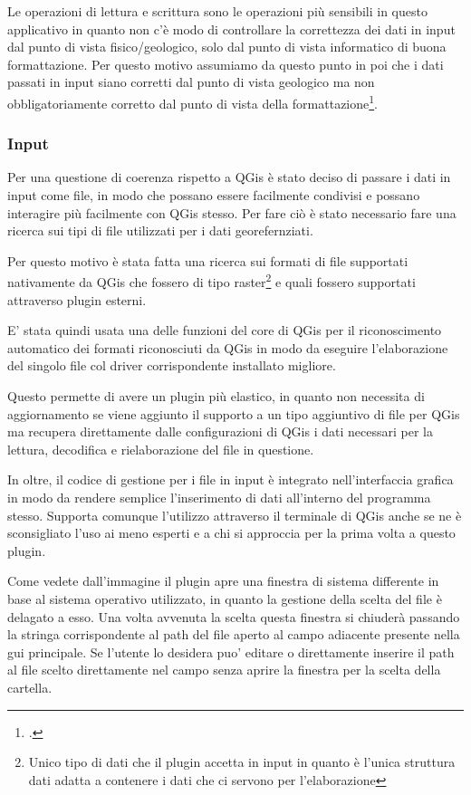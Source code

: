 Le operazioni di lettura e scrittura sono le operazioni più sensibili in questo applicativo in quanto non c'è modo di controllare la correttezza dei dati in input dal punto di vista fisico/geologico, solo dal punto di vista informatico di buona formattazione.
Per questo motivo assumiamo da questo punto in poi che i dati passati in input siano corretti dal punto di vista geologico ma non obbligatoriamente corretto dal punto di vista della formattazione\footcite{Il controllo del formato del file viene fatto in modo automatico quando il plugin cerca di caricare i file passati per indirizzo}. 

\subsubsection{Input}
Per una questione di coerenza rispetto a QGis è stato deciso di passare i dati in input come file, in modo che possano essere facilmente condivisi e possano interagire più facilmente con QGis stesso. Per fare ciò è stato necessario fare una ricerca sui tipi di file utilizzati per i dati georefernziati.

Per questo motivo è stata fatta una ricerca sui formati di file supportati nativamente da QGis che fossero di tipo raster\footnote{Unico tipo di dati che il plugin accetta in input in quanto è l'unica struttura dati adatta a contenere i dati che ci servono per l'elaborazione} e quali fossero supportati attraverso plugin esterni.

E' stata quindi usata una delle funzioni del core di QGis per il riconoscimento automatico dei formati riconosciuti da QGis in modo da eseguire l'elaborazione del singolo file col driver corrispondente installato migliore.

Questo permette di avere un plugin più elastico, in quanto non necessita di aggiornamento se viene aggiunto il supporto a un tipo aggiuntivo di file per QGis ma recupera direttamente dalle configurazioni di QGis i dati necessari per la lettura, decodifica e rielaborazione del file in questione.

In oltre, il codice di gestione per i file in input è integrato nell'interfaccia grafica in modo da rendere semplice l'inserimento di dati all'interno del programma stesso. Supporta comunque l'utilizzo attraverso il terminale di QGis anche se ne è sconsigliato l'uso ai meno esperti e a chi si approccia per la prima volta a questo plugin.

Come vedete dall'immagine il plugin apre una finestra di sistema differente in base al sistema operativo utilizzato, in quanto la gestione della scelta del file è delagato a esso. Una volta avvenuta la scelta questa finestra si chiuderà passando la stringa corrispondente al path del file aperto al campo adiacente presente nella gui principale. %
Se l'utente lo desidera puo' editare o direttamente inserire il path al file scelto direttamente nel campo senza aprire la finestra per la scelta della cartella.


